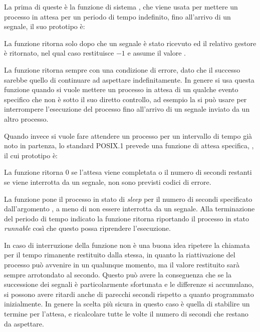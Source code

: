 La prima di queste è la funzione di sistema , che viene usata per
mettere un processo in attesa per un periodo di tempo indefinito, fino
all'arrivo di un segnale, il suo prototipo è:

\begin{funcproto}{
}

{La funzione ritorna solo dopo che un segnale è stato ricevuto ed il relativo
  gestore è ritornato, nel qual caso restituisce $-1$ e  assume il
  valore .}
\end{funcproto}

La funzione ritorna sempre con una condizione di errore, dato che il successo
sarebbe quello di continuare ad aspettare indefinitamente. In genere si usa
questa funzione quando si vuole mettere un processo in attesa di un qualche
evento specifico che non è sotto il suo diretto controllo, ad esempio la si
può usare per interrompere l'esecuzione del processo fino all'arrivo di un
segnale inviato da un altro processo.

Quando invece si vuole fare attendere un processo per un intervallo di tempo
già noto in partenza, lo standard POSIX.1 prevede una funzione di attesa
specifica, , il cui prototipo è:

\begin{funcproto}{

}

{La funzione ritorna $0$ se l'attesa viene completata  o il
  numero di secondi restanti se viene interrotta da un segnale, non sono
  previsti codici di errore.}
\end{funcproto}

La funzione pone il processo in stato di \textit{sleep} per il numero di
secondi specificato dall'argomento , a meno di non essere
interrotta da un segnale. Alla terminazione del periodo di tempo indicato la
funzione ritorna riportando il processo in stato \textit{runnable} così che
questo possa riprendere l'esecuzione.

In caso di interruzione della funzione non è una buona idea ripetere la
chiamata per il tempo rimanente restituito dalla stessa, in quanto la
riattivazione del processo può avvenire in un qualunque momento, ma il valore
restituito sarà sempre arrotondato al secondo. Questo può avere la conseguenza
che se la successione dei segnali è particolarmente sfortunata e le differenze
si accumulano, si possono avere ritardi anche di parecchi secondi rispetto a
quanto programmato inizialmente. In genere la scelta più sicura in questo caso
è quella di stabilire un termine per l'attesa, e ricalcolare tutte le volte il
numero di secondi che restano da aspettare.

